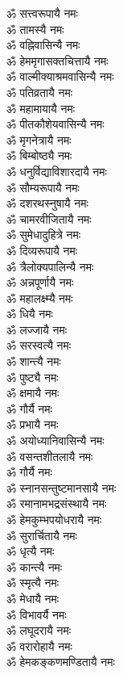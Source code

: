 \begin{multicols}{2}
\begin{flushleft}
ॐ सत्त्वरूपायै नमः\\
ॐ तामस्यै नमः\\
ॐ वह्निवासिन्यै नमः\\
ॐ हेममृगासक्तचित्तायै नमः\\
ॐ वाल्मीक्याश्रमवासिन्यै नमः\\
ॐ पतिव्रतायै नमः\\
ॐ महामायायै नमः\\
ॐ पीतकौशेयवासिन्यै नमः\\
ॐ मृगनेत्रायै नमः\\
ॐ बिम्बोष्ठ्यै नमः\hfill{}\\
ॐ धनुर्विद्याविशारदायै नमः\\
ॐ सौम्यरूपायै नमः\\
ॐ दशरथस्नुषायै नमः\\
ॐ चामरवीजितायै नमः\\
ॐ सुमेधादुहित्रे नमः\\
ॐ दिव्यरूपायै नमः\\
ॐ त्रैलोक्यपालिन्यै नमः\\
ॐ अन्नपूर्णायै नमः\\
ॐ महालक्ष्म्यै नमः\\
ॐ धियै नमः\hfill{}\\
ॐ लज्जायै नमः\\
ॐ सरस्वत्यै नमः\\
ॐ शान्त्यै नमः\\
ॐ पुष्ट्यै नमः\\
ॐ क्षमायै नमः\\
ॐ गौर्यै नमः\\
ॐ प्रभायै नमः\\
ॐ अयोध्यानिवासिन्यै नमः\\
ॐ वसन्तशीतलायै नमः\\
ॐ गौर्यै नमः\hfill{}\\
ॐ स्नानसन्तुष्टमानसायै नमः\\
ॐ रमानामभद्रसंस्थायै नमः\\
ॐ हेमकुम्भपयोधरायै नमः\\
ॐ सुरार्चितायै नमः\\
ॐ धृत्यै नमः\\
ॐ कान्त्यै नमः\\
ॐ स्मृत्यै नमः\\
ॐ मेधायै नमः\\
ॐ विभावर्यै नमः\\
ॐ लघूदरायै नमः\hfill{}\\
ॐ वरारोहायै नमः\\
ॐ हेमकङ्कणमण्डितायै नमः\\

\end{flushleft}
\end{multicols}

